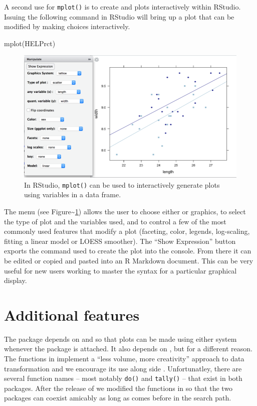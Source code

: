 A second use for \texttt{mplot()} is to create  and
 plots interactively within RStudio. Issuing the following
command in RStudio will bring up a plot that can be modified by making
choices interactively.

\begin{Schunk}
\begin{Sinput}
mplot(HELPrct)
\end{Sinput}
\end{Schunk}

\begin{figure}
\includegraphics{half-mplot.png}
\caption{In RStudio, \texttt{mplot()} can be used to interactively generate 
plots using variables in a data frame.}
\label{fig:mplot}
\end{figure}

\noindent
The menu (see Figure\textasciitilde{}\ref{fig:mplot}) allows the user to
choose either  or  graphics, to select the
type of plot and the variables used, and to control a few of the most
commonly used features that modify a plot (faceting, color, legends,
log-scaling, fitting a linear model or LOESS smoother). The ``Show
Expression'' button exports the command used to create the plot into the
console. From there it can be edited or copied and pasted into an R
Markdown document. This can be very useful for new users working to
master the syntax for a particular graphical display.

\section{Additional features}\label{additional-features}

The  package depends on  and  so
that plots can be made using either system whenever the 
package is attached. It also depends on  \citep{dplyr},
but for a different reason. The functions in  implement a
``less volume, more creativity'' approach to data transformation and we
encourage its use along side . Unfortunatley, there are
several function names -- most notably \texttt{do()} and
\texttt{tally()} -- that exist in both packages. After the release of
 we modified the functions in  so that the two
packages can coexist amicably as long as  comes before
 in the search path.

